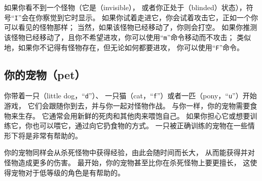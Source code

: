 \documentclass[a4paper, 10pt]{article}
\begin{document}
如果你看不到一个怪物（它是\zhTransInvisible（invisible），
或者你正处于\zhTransBlind{}（blinded）状态），符号“{\tt I}”会在你察觉到它时显示。
如果你试着走进它，你会试着攻击它，正如一个你可以看见的怪物那样；
当然，如果该怪物已经移动了，你则会打空。
如果你推测该怪物已经移动了，且你不希望进攻，你可以使用“{\tt m}”命令移动而不攻击；
类似地，如果你不记得有怪物存在，但无论如何都要进攻，
你可以使用“{\tt F}”命令。

\subsection*{你的宠物（pet）}

你带着一只\zhTransLittleDog（little dog，“{\tt d}”）、
一只猫（cat，“{\tt f}”）或者一匹\zhTransPony（pony，“{\tt u}”）开始游戏，
它们会跟随你到\zhTransDungeon{}去，并与你一起对怪物作战。
与你一样，你的宠物需要食物来生存。
它通常会用新鲜的死肉和其他肉来喂饱自己。
如果你担心它或想要训练它，你也可以喂它，通过向它扔食物的方式。
一只被正确训练的宠物在一些情形下将是非常有帮助的。

你的宠物同样会从杀死怪物中获得经验，由此会随时间而长大，
从而能获得\zhTransHitPoints{}并对怪物造成更多的伤害。
最开始，你的宠物甚至比你在杀死怪物上要更擅长，
这使得宠物对于低等级的角色是有帮助的。
\end{document}

